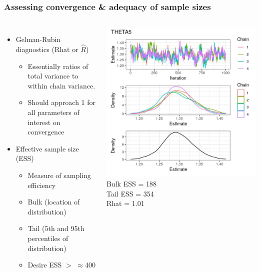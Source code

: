 \documentclass{beamer}
\begin{document}
\begin{frame}
  \frametitle{Assessing convergence \& adequacy of sample sizes}

\begin{columns}
  \begin{itemize}
    \item Gelman-Rubin diagnostics (Rhat or $\hat{R}$)
          \begin{itemize}
            \item Essentially ratios of total variance to within chain variance.
            \item Should approach 1 for all parameters of interest on convergence
          \end{itemize}
    \item Effective sample size (ESS)
          \begin{itemize}
            \item Measure of sampling efficiency
            \item Bulk (location of distribution)
            \item Tail (5th and 95th percentiles of distribution)
            \item Desire ESS $>$ $\approx$400
          \end{itemize}
  \end{itemize}
  \center
  \vspace{-16pt}
  \includegraphics[width=\textwidth]{graphics/poor-ess.pdf}\\
  Bulk ESS = 188\\
  Tail ESS = 354\\
  Rhat = 1.01
\end{columns}

\end{frame}
\end{document}
